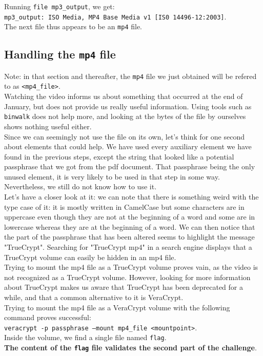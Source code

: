 \documentclass[12pt,a4paper]{article}
\begin{document}
    Running \texttt{file mp3\_output}, we get:\\
    \texttt{mp3\_output: ISO Media, MP4 Base Media v1 [IS0 14496-12:2003]}.\\
    The next file thus appears to be an \texttt{mp4} file.


    \subsection{Handling the \texttt{mp4} file}
    Note: in that section and thereafter, the \texttt{mp4} file we just
    obtained will be refered to as \texttt{<mp4\_file>}.\\

    Watching the video informs us about something that occurred at the end of January, but does not provide us really useful information. Using tools such as \texttt{binwalk} does not help more, and looking at the bytes of the file by ourselves shows nothing useful either.\\

    Since we can seemingly not use the file on its own, let's think for one
    second about elements that could help. We have used every auxiliary element
    we have found in the previous steps, except the string that looked like a
    potential passphrase that we got from the pdf document. That passphrase
    being the only unused element, it is very likely to be used in that step in
    some way. Nevertheless, we still do not know how to use it.\\

    Let's have a closer look at it: we can note that there is something weird
    with the type case of it: it is mostly written in CamelCase but some
    characters are in uppercase even though they are not at the beginning of a
    word and some are in lowercase whereas they are at the beginning of a word.
    We can then notice that the part of the passphrase that has been altered
    seems to highlight the message "TrueCrypt". Searching for "TrueCrypt mp4"
    in a search engine displays that a TrueCrypt volume can easily be hidden in
    an mp4 file.\\

    Trying to mount the mp4 file as a TrueCrypt volume proves vain, as the
    video is not recognized as a TrueCrypt volume. However, looking for more
    information about TrueCrypt makes us aware that TrueCrypt has been
    deprecated for a while, and that a common alternative to it is VeraCrypt.\\

    Trying to mount the mp4 file as a VeraCrypt volume with the following
    command proves successful:\\
    \texttt{veracrypt -p passphrase --mount mp4\_file <mountpoint>}.\\
    Inside the volume, we find a single file named \texttt{flag}.\\

    \textbf{The content of the \texttt{flag} file validates the second part of the challenge}.
\end{document}
